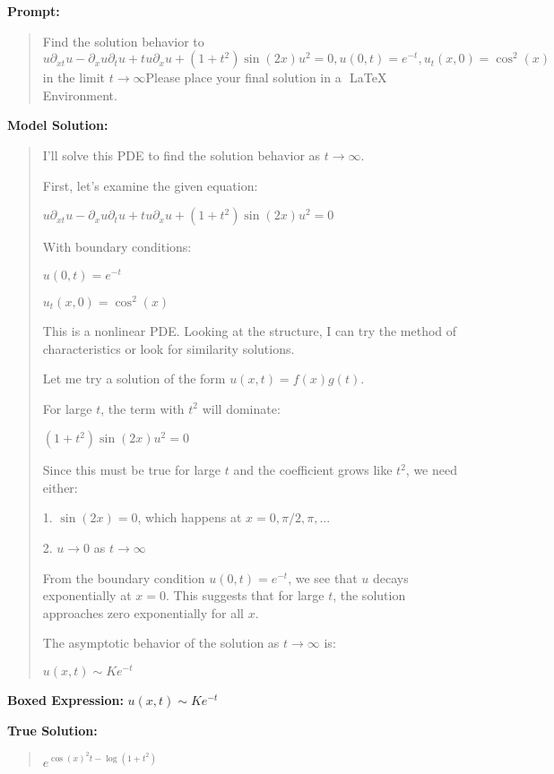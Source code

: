 \documentclass{article}
\begin{document}
\textbf{Prompt:}
\begin{quote}
Find the solution behavior to$u \partial_{xt} u - \partial_x u \partial_t u + t u \partial_x u + (1 + t^2) \sin(2x) u^2 = 0, u(0, t) = e^{-t}, u_t(x, 0) = \cos^2(x)$ in the limit $t \to \infty$Please place your final solution in a $\boxed{}$ LaTeX Environment.
\end{quote}
\textbf{Model Solution:}
\begin{quote}
I'll solve this PDE to find the solution behavior as $t \to \infty$.



First, let's examine the given equation:

$u \partial_{xt} u - \partial_x u \partial_t u + t u \partial_x u + (1 + t^2) \sin(2x) u^2 = 0$



With boundary conditions:

$u(0, t) = e^{-t}$

$u_t(x, 0) = \cos^2(x)$



This is a nonlinear PDE. Looking at the structure, I can try the method of characteristics or look for similarity solutions. 



Let me try a solution of the form $u(x,t) = f(x)g(t)$.



For large $t$, the term with $t^2$ will dominate:

$(1 + t^2) \sin(2x) u^2 = 0$



Since this must be true for large $t$ and the coefficient grows like $t^2$, we need either:

1. $\sin(2x) = 0$, which happens at $x = 0, \pi/2, \pi, ...$

2. $u \to 0$ as $t \to \infty$



From the boundary condition $u(0,t) = e^{-t}$, we see that $u$ decays exponentially at $x = 0$. This suggests that for large $t$, the solution approaches zero exponentially for all $x$.



The asymptotic behavior of the solution as $t \to \infty$ is:



$\boxed{u(x,t) \sim Ke^{-t}}$
\end{quote}
\textbf{Boxed Expression:} $u(x,t) \sim Ke^{-t}$

\textbf{True Solution:}
\begin{quote}
$e^{\cos(x)^2 t - \log(1 + t^2)}$
\end{quote}
\end{document}
